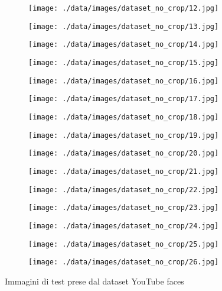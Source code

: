 \begin{figure}
\begin{subfigure}{0.1 \textwidth}
		\texttt{[image: ./data/images/dataset\_no\_crop/12.jpg]}
	\end{subfigure}
	\begin{subfigure}{0.1 \textwidth}
		\texttt{[image: ./data/images/dataset\_no\_crop/13.jpg]}
	\end{subfigure}
	\begin{subfigure}{0.1 \textwidth}
		\texttt{[image: ./data/images/dataset\_no\_crop/14.jpg]}
	\end{subfigure}
	\begin{subfigure}{0.1 \textwidth}
		\texttt{[image: ./data/images/dataset\_no\_crop/15.jpg]}
	\end{subfigure}
	\begin{subfigure}{0.1 \textwidth}
		\texttt{[image: ./data/images/dataset\_no\_crop/16.jpg]}
	\end{subfigure}
	\begin{subfigure}{0.1 \textwidth}
		\texttt{[image: ./data/images/dataset\_no\_crop/17.jpg]}
	\end{subfigure}
	\begin{subfigure}{0.1 \textwidth}
		\texttt{[image: ./data/images/dataset\_no\_crop/18.jpg]}
	\end{subfigure}
	\begin{subfigure}{0.1 \textwidth}
		\texttt{[image: ./data/images/dataset\_no\_crop/19.jpg]}
	\end{subfigure}
	\begin{subfigure}{0.1 \textwidth}
		\texttt{[image: ./data/images/dataset\_no\_crop/20.jpg]}
	\end{subfigure}
	\begin{subfigure}{0.1 \textwidth}
		\texttt{[image: ./data/images/dataset\_no\_crop/21.jpg]}
	\end{subfigure}
	\begin{subfigure}{0.1 \textwidth}
		\texttt{[image: ./data/images/dataset\_no\_crop/22.jpg]}
	\end{subfigure}
	\begin{subfigure}{0.1 \textwidth}
		\texttt{[image: ./data/images/dataset\_no\_crop/23.jpg]}
	\end{subfigure}
	\begin{subfigure}{0.1 \textwidth}
		\texttt{[image: ./data/images/dataset\_no\_crop/24.jpg]}
	\end{subfigure}
	\begin{subfigure}{0.1 \textwidth}
		\texttt{[image: ./data/images/dataset\_no\_crop/25.jpg]}
	\end{subfigure}
	\begin{subfigure}{0.1 \textwidth}
		\texttt{[image: ./data/images/dataset\_no\_crop/26.jpg]}
	\end{subfigure}
	\caption{Immagini di test prese dal dataset YouTube faces \cite{wolf2011face}}
	\label{test_images}
\end{figure}

